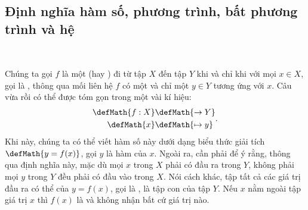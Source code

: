\subsection{Định nghĩa hàm số, phương trình, bất phương trình và hệ}

\ %

Chúng ta gọi $f$ là một  (hay ) đi từ tập $X$ đến tập $Y$ khi và chỉ khi với mọi $x\in X$, gọi là , thông qua mối liên hệ $f$ có một và chỉ một $y\in Y$ tương ứng với $x$. Câu vừa rồi có thể được tóm gọn trong một vài kí hiệu: $$\begin{aligned}\defMath{f: X} &\defMath{\to Y} \\ \defMath{x} &\defMath{\mapsto y}\end{aligned}.$$ Khi này, chúng ta có thể viết hàm số này dưới dạng biểu thức giải tích $\defMath{y=f(x)}$, gọi $y$ là hàm của $x$. Ngoài ra, cần phải để ý rằng, thông qua định nghĩa này, mặc dù mọi $x$ trong $X$ phải có đầu ra trong $Y$, không phải mọi $y$ trong $Y$ đều phải có đầu vào trong $X$. Nói cách khác, tập tất cả các giá trị đầu ra có thể của $y=f(x)$, gọi là , là tập con của tập $Y$. Nếu $x$ nằm ngoài tập giá trị $x$ thì $f(x)$ là  và không nhận bất cứ giá trị nào.

